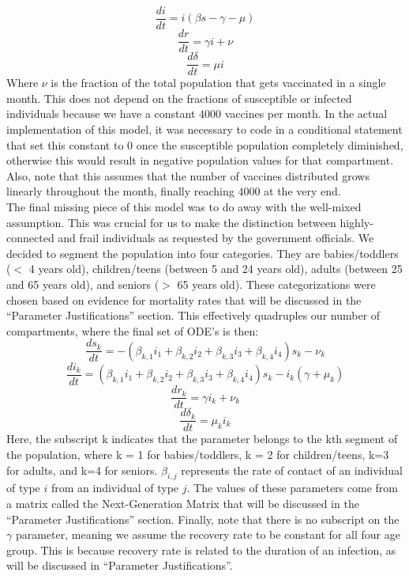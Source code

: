 \documentclass[titlepage]{article}
\begin{document}
	\[
		\frac{di}{dt} =  i (\beta s -\gamma - \mu)
	\]
	\[
		\frac{dr}{dt} = \gamma i + \nu
	\]
	\[
		\frac{d\delta}{dt} = \mu i
	\]
	Where $\nu$ is the fraction of the total population that gets vaccinated in a single month. This does not depend on the fractions of susceptible or infected individuals because we have a constant $4000$ vaccines per month. In the actual implementation of this model, it was necessary to code in a conditional statement that set this constant to $0$ once the susceptible population completely diminished, otherwise this would result in negative population values for that compartment. Also, note that this assumes that the number of vaccines distributed grows linearly throughout the month, finally reaching $4000$ at the very end.\\ 

	The final missing piece of this model was to do away with the well-mixed assumption. This was crucial for us to make the distinction between highly-connected and frail individuals as requested by the government officials. We decided to segment the population into four categories. They are babies/toddlers ($<$ 4 years old), children/teens (between 5 and 24 years old), adults (between 25 and 65 years old), and seniors ($>$ 65 years old). These categorizations were chosen based on evidence for mortality rates that will be discussed in the ``Parameter Justifications'' section. This effectively quadruples our number of compartments, where the final set of ODE's is then:
	\[
		\frac{ds_k}{dt} = - (\beta_{k,1} i_1 + \beta_{k,2} i_2 + \beta_{k,3} i_3 + \beta_{k,4} i_4) s_k - \nu_k
	\]
	\[
		\frac{di_k}{dt} =  (\beta_{k,1} i_1 + \beta_{k,2} i_2 + \beta_{k,3} i_3 + \beta_{k,4} i_4) s_k - i_k (\gamma + \mu_k)
	\]
	\[
		\frac{dr_k}{dt} = \gamma i_k + \nu_k
	\]
	\[
		\frac{d\delta_k}{dt} = \mu_k i_k
	\]
	Here, the subscript k indicates that the parameter belongs to the kth segment of the population, where k = 1 for babies/toddlers, k = 2 for children/teens, k=3 for adults, and k=4 for seniors. $\beta_{i,j}$ represents the rate of contact of an individual of type $i$ from an individual of type $j$. The values of these parameters come from a matrix called the Next-Generation Matrix \cite{NGM} that will be discussed in the ``Parameter Justifications'' section. Finally, note that there is no subscript on the $\gamma$ parameter, meaning we assume the recovery rate to be constant for all four age group. This is because recovery rate is related to the duration of an infection, as will be discussed in ``Parameter Justifications''.\\
\end{document}
